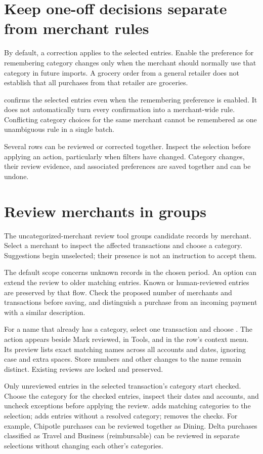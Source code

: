 \section{Keep one-off decisions separate from merchant rules}
By default, a correction applies to the selected entries. Enable the preference for remembering category changes only when the merchant should normally use that category in future imports. A grocery order from a general retailer does not establish that all purchases from that retailer are groceries.

 confirms the selected entries even when the remembering preference is enabled. It does not automatically turn every confirmation into a merchant-wide rule. Conflicting category choices for the same merchant cannot be remembered as one unambiguous rule in a single batch.

Several rows can be reviewed or corrected together. Inspect the selection before applying an action, particularly when filters have changed. Category changes, their review evidence, and associated preferences are saved together and can be undone.

\section{Review merchants in groups}
The uncategorized-merchant review tool groups candidate records by merchant. Select a merchant to inspect the affected transactions and choose a category. Suggestions begin unselected; their presence is not an instruction to accept them.

The default scope concerns unknown records in the chosen period. An option can extend the review to older matching entries. Known or human-reviewed entries are preserved by that flow. Check the proposed number of merchants and transactions before saving, and distinguish a purchase from an incoming payment with a similar description.

For a name that already has a category, select one transaction and choose . The action appears beside Mark reviewed, in Tools, and in the row's context menu. Its preview lists exact matching names across all accounts and dates, ignoring case and extra spaces. Store numbers and other changes to the name remain distinct. Existing reviews are locked and preserved.

Only unreviewed entries in the selected transaction's category start checked. Choose the category for the checked entries, inspect their dates and accounts, and uncheck exceptions before applying the review.  adds matching categories to the selection;  adds entries without a resolved category;  removes the checks. For example, Chipotle purchases can be reviewed together as Dining. Delta purchases classified as Travel and Business (reimbursable) can be reviewed in separate selections without changing each other's categories.

